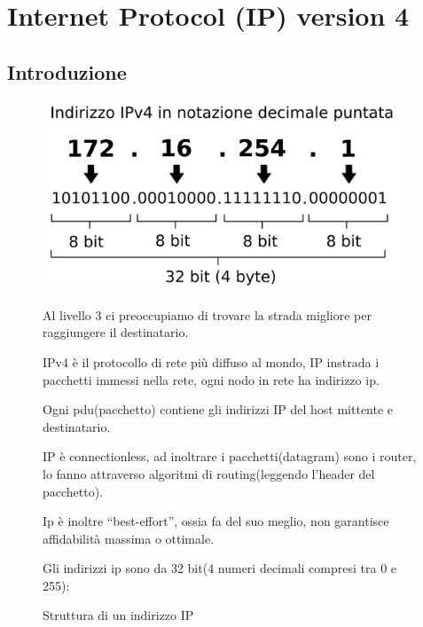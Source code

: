 

\section{Internet Protocol (IP) version 4}

\subsection*{Introduzione}
\begin{figure}[h!]
    \begin{minipage}{0.45\textwidth}
        \centering
        \includegraphics[width=0.95\textwidth]{images/indirizzoip.png}
        \caption{Struttura di un indirizzo IP}
        \label{fig:indirizzoip}
    \end{minipage}\hfill
    \begin{minipage}{0.52\textwidth}
        Al livello 3 ci preoccupiamo di trovare la strada migliore per raggiungere il destinatario.

        IPv4 è il protocollo di rete più diffuso al mondo, IP instrada i pacchetti immessi nella rete, ogni nodo in rete ha indirizzo ip.

        Ogni pdu(pacchetto) contiene gli indirizzi IP del host mittente e destinatario.
        
        IP è connectionless, ad inoltrare i pacchetti(datagram) sono i router, lo fanno attraverso algoritmi di routing(leggendo l’header del pacchetto). 

        Ip è inoltre “best-effort”, ossia fa del suo meglio, non garantisce affidabilità massima o ottimale.

        Gli indirizzi ip sono da 32 bit(4 numeri decimali compresi tra 0 e 255):
    \end{minipage}
\end{figure}

